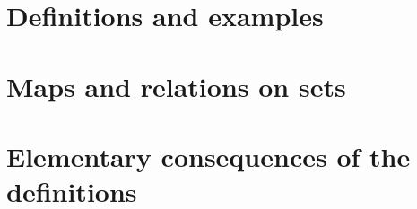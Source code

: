 

\newcommand{\get}[1]{\section{#1}}



\get{Definitions and examples}
\get{Maps and relations on sets}
\get{Elementary consequences of the definitions}


